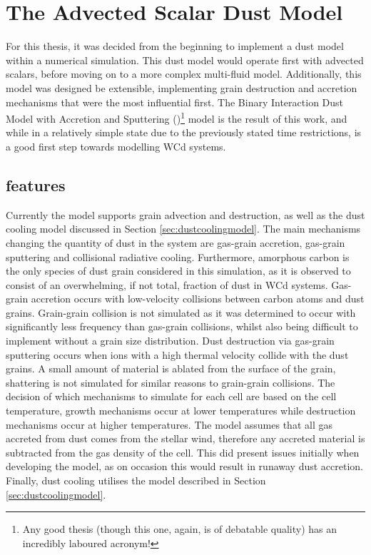 \section{The \bidmas{} Advected Scalar Dust Model}
\label{sec:bidmas}

For this thesis, it was decided from the beginning to implement a dust model within a numerical simulation.
This dust model would operate first with advected scalars, before moving on to a more complex multi-fluid model.
Additionally, this model was designed be extensible, implementing grain destruction and accretion mechanisms that were the most influential first.
The Binary Interaction Dust Model with Accretion and Sputtering (\bidmas{})\footnote{Any good thesis (though this one, again, is of debatable quality) has an incredibly laboured acronym!} model is the result of this work, and while in a relatively simple state due to the previously stated time restrictions, is a good first step towards modelling WCd systems.

\subsection{\bidmas{} features}

Currently the \bidmas{} model supports grain advection and destruction, as well as the dust cooling model discussed in Section \ref{sec:dustcoolingmodel}.
The main mechanisms changing the quantity of dust in the system are gas-grain accretion, gas-grain sputtering and collisional radiative cooling.
Furthermore, amorphous carbon is the only species of dust grain considered in this simulation, as it is observed to consist of an overwhelming, if not total, fraction of dust in WCd systems.
Gas-grain accretion occurs with low-velocity collisions between carbon atoms and dust grains.
Grain-grain collision is not simulated as it was determined to occur with significantly less frequency than gas-grain collisions, whilst also being difficult to implement without a grain size distribution.
Dust destruction via gas-grain sputtering occurs when ions with a high thermal velocity collide with the dust grains.
A small amount of material is ablated from the surface of the grain, shattering is not simulated for similar reasons to grain-grain collisions.
The decision of which mechanisms to simulate for each cell are based on the cell temperature, growth mechanisms occur at lower temperatures while destruction mechanisms occur at higher temperatures.
The \bidmas{} model assumes that all gas accreted from dust comes from the stellar wind, therefore any accreted material is subtracted from the gas density of the cell.
This did present issues initially when developing the model, as on occasion this would result in runaway dust accretion.
Finally, dust cooling utilises the model described in Section \ref{sec:dustcoolingmodel}. 

